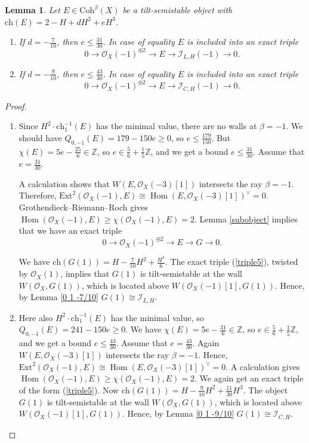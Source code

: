 \documentclass{amsart}
\DeclareMathOperator{\Hom}{Hom}
\newtheorem{lemma}[theorem]{Lemma}
\begin{document}
	\begin{lemma}\label{2 -1 -7/10} Let $E\in\mathrm{Coh}^\beta(X)$ be a tilt-semistable object with $\mathrm{ch}(E)=2-H+dH^2+eH^3$.
		\begin{enumerate}
			\item If $d=-\frac{7}{10}$, then $e\le\frac{31}{30}$. In case of equality $E$ is included into an exact triple
			$$0\to \mathcal O_X(-1)^{\oplus 2}\to E\to\mathcal I_{L,H}(-1)\to 0.$$
			\item If $d=-\frac{9}{10}$, then $e\le\frac{43}{30}$. In case of equality $E$ is included into an exact triple
			$$0\to \mathcal O_X(-1)^{\oplus 2}\to E\to\mathcal I_{C,H}(-1)\to 0.$$
		\end{enumerate}	
	\end{lemma}
	
	\begin{proof} 
		\begin{enumerate}
			\item 
			Since $H^2\cdot\mathrm{ch}_1^{-1}(E)$ has the minimal value, there are no walls at $\beta=-1$. We should have $Q_{0,-1}(E)=179-150e\ge 0$, so $e\le\frac{179}{150}$. But $\chi(E)=5e-\frac{25}{6}\in\mathbb Z$, so $e\in\frac 56+\frac 15\mathbb Z$, and we get a bound $e\le\frac{31}{30}$. Assume that $e=\frac{31}{30}$.
			
			A calculation shows that $W(E,\mathcal O_X(-3)[1])$ intersects the ray $\beta=-1$. Therefore, $\mathrm{Ext}^2(\mathcal O_X(-1),E)\cong\Hom(E,\mathcal O_X(-3)[1])^\vee=0$. Grothendieck--Riemann--Roch gives $\Hom(\mathcal O_X(-1),E)\ge\chi(\mathcal O_X(-1),E)=2$. Lemma \ref{subobject} implies that we have an exact triple
			\begin{equation}\label{triple5}0\to\mathcal O_X(-1)^{\oplus 2}\to E\to G\to 0.\end{equation}
			
			We have $\mathrm{ch}(G(1))=H-\frac{7}{10}H^2+\frac{H^3}{6}$. The exact triple (\ref{triple5}), twisted by $\mathcal O_X(1)$, implies that $G(1)$ is tilt-semistable at the wall $W(\mathcal O_X,G(1))$, which is located above $W(\mathcal O_X(-1)[1],G(1))$. Hence, by Lemma \ref{0 1 -7/10} $G(1)\cong\mathcal I_{L,H}$.
			
			\item Here also $H^2\cdot\mathrm{ch}_1^{-1}(E)$ has the minimal value, so $Q_{0,-1}(E)=241-150e\ge 0$. We have $\chi(E)=5e-\frac{31}{6}\in\mathbb Z$, so $e\in\frac 56+\frac 15\mathbb Z$, and we get a bound $e\le\frac{43}{30}$. Assume that $e=\frac{43}{30}$. Again $W(E,\mathcal O_X(-3)[1])$ intersects the ray $\beta=-1$. Hence, $\mathrm{Ext}^2(\mathcal O_X(-1),E)\cong\Hom(E,\mathcal O_X(-3)[1])^\vee=0$. A calculation gives $\Hom(\mathcal O_X(-1),E)\ge\chi(\mathcal O_X(-1),E)=2$. We again get an exact triple of the form (\ref{triple5}). Now $\mathrm{ch}(G(1))=H-\frac{9}{10}H^2+\frac{11}{30}H^3$. The object $G(1)$ is tilt-semistable at the wall $W(\mathcal O_X,G(1))$, which is located above $W(\mathcal O_X(-1)[1],G(1))$. Hence, by Lemma \ref{0 1 -9/10} $G(1)\cong\mathcal I_{C,H}$.
		\end{enumerate}
	\end{proof}
	
\end{document}
